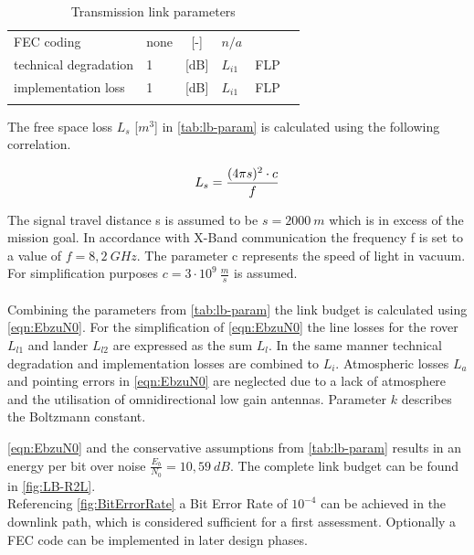 \begin{table}[h]
\begin{tabular}{llclll}
FEC coding                       & none   & {[}-{]}    & ${n/a}$       &                              &  \\
technical degradation            & 1      & {[}dB{]}   & ${L}_{i1}$    & FLP                          &  \\
implementation loss              & 1      & {[}dB{]}   & ${L}_{i1}$	   & FLP                          &  \\
                                 &        &            &               &                              & 
\end{tabular}
\caption{Transmission link parameters}
\label{tab:lb-param}
\end{table}

The free space loss ${L}_{s}$ [$m^3$] in \autoref{tab:lb-param} is calculated using the following correlation. 

\begin{equation}
	\centering
		{L}_{s} = {\frac{(4 \pi s)^2 \cdot c}{f}}
	\label{eqn:Ls}
\end{equation}

The signal travel distance {s} is assumed to be $s = 2000\ m$ which is in excess of the mission goal. In accordance with X-Band communication the frequency {f} is set to a value of $f = 8,2\ GHz$. The parameter c represents the speed of light in vacuum. For simplification purposes $c = 3 \cdot 10^9\ \frac{m}{s}$ is assumed. \\ \\   
Combining the parameters from \autoref{tab:lb-param} the link budget is calculated using \autoref{eqn:EbzuN0}. For the simplification of \autoref{eqn:EbzuN0} the line losses for the rover ${L}_{l1}$ and lander ${L}_{l2}$ are expressed as the sum ${L}_{l}$. In the same manner technical degradation and implementation losses are combined to ${L}_{i}$. Atmospheric losses ${L}_{a}$ and pointing errors in \autoref{eqn:EbzuN0} are neglected due to a lack of atmosphere and the utilisation of omnidirectional low gain antennas. Parameter ${k}$ describes the Boltzmann constant.   


\autoref{eqn:EbzuN0} and the conservative assumptions from \autoref{tab:lb-param} results in an energy per bit over noise $\frac{{E}_{b}}{{N}_{0}} = 10,59\ dB$. The complete link budget can be found in \autoref{fig:LB-R2L}. \\
Referencing \autoref{fig:BitErrorRate} a Bit Error Rate of $10^{-4}$ can be achieved in the downlink path, which is considered sufficient for a first assessment. Optionally a FEC code can be implemented in later design phases.\\

